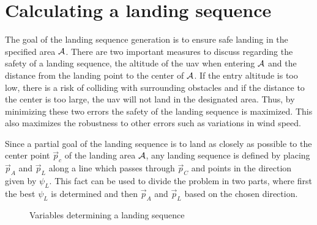 \section{Calculating a landing sequence}
The goal of the landing sequence generation is to ensure safe landing in the specified area $\mathcal{A}$. There are two important measures to 
discuss regarding the safety of a landing sequence, the altitude of the \ac{uav} when entering $\mathcal{A}$ and the distance from the landing point to the center of $\mathcal{A}$. 
If the entry altitude is too low, there is a risk of colliding with surrounding obstacles and if the distance to the center is too large, the \ac{uav} will not land in the designated area. 
Thus, by minimizing these two errors the safety of the landing sequence is maximized. This also maximizes the robustness to other errors such as 
variations in wind speed.

Since a partial goal of the landing sequence is to land as closely as possible to the center point $\vec{p}_c$ of the landing area $\mathcal{A}$, any 
landing sequence is defined by placing $\vec{p}_A$ and $\vec{p}_L$ along a line which passes through $\vec{p}_C$ and points in the direction given by $\psi_L$.
This fact can be used to divide the problem in two parts, where first the best $\psi_L$ is determined and then $\vec{p}_A$ and $\vec{p}_L$ based on the chosen direction.

\begin{figure}
    \begin{center}
    \end{center}
    \caption{Variables determining a landing sequence}
    \label{fig:opt_landing}
\end{figure}

